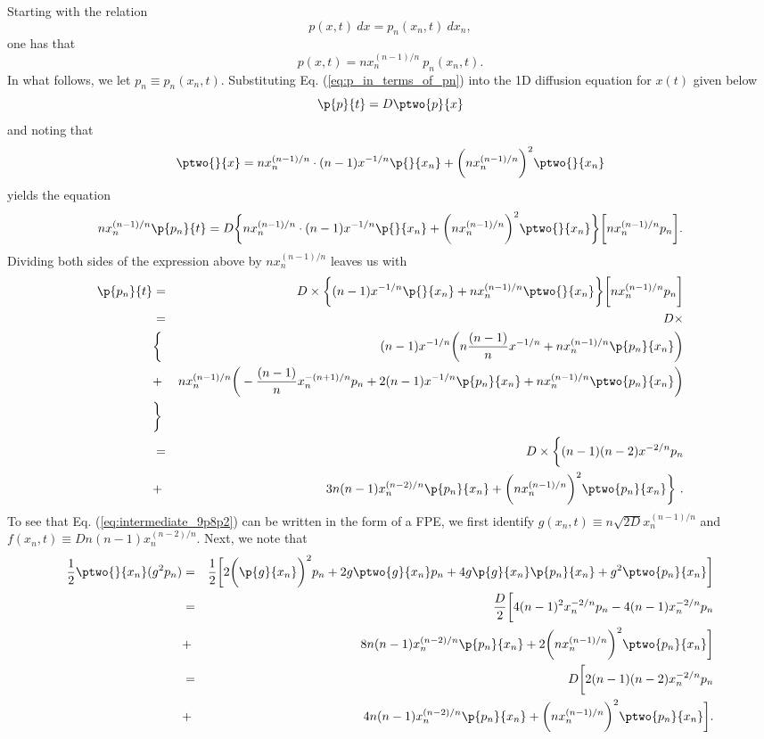 Starting with the relation
\begin{equation}
p(x, t) ~ dx = p_n(x_n, t) ~ dx_n ,  \nonumber
\end{equation}
one has that 
\begin{equation}
p(x, t) = n x_n^{(n-1)/n} ~ p_n(x_n, t). \label{eq:p_in_terms_of_pn}
\end{equation}
In what follows, we let $p_n \equiv p_n(x_n, t)$. Substituting Eq. (\ref{eq:p_in_terms_of_pn}) into the 1D diffusion equation for $x(t)$ given below
\begin{equation}
\p{p}{t} = D \ptwo{p}{x}
\end{equation}
and noting that
\begin{equation}
\ptwo{}{x} = n x_n^{(n-1)/n} \cdot (n-1) x^{-1/n} \p{}{x_n} + \bigg(n x_n^{(n-1)/n}\bigg)^2 \ptwo{}{x_n}
\end{equation}
yields the equation
\begin{equation}
n x_n^{(n-1)/n} \p{p_n}{t} = D \bigg\{ n x_n^{(n-1)/n}\cdot (n-1) x^{-1/n} \p{}{x_n} + \bigg(n x_n^{(n-1)/n}\bigg)^2 \ptwo{}{x_n}\bigg\} \bigg[n x_n^{(n-1)/n} p_n\bigg]. \nonumber 
\end{equation}
Dividing both sides of the expression above by $n x_n^{(n-1)/n}$ leaves us with
\begin{eqnarray}
 \p{p_n}{t} &=& D \times \bigg\{(n-1) x^{-1/n} \p{}{x_n} + n x_n^{(n-1)/n} \ptwo{}{x_n}\bigg\} \bigg[n x_n^{(n-1)/n} p_n\bigg] \nonumber \\
 &=& D \times \nonumber \\
 &\bigg\{& (n-1) x^{-1/n} \bigg( n \frac{(n-1)}{n} x^{-1/n} + n x_n^{(n-1)/n} \p{p_n}{x_n}\bigg) \nonumber \\
 &+&  n x_n^{(n-1)/n} \bigg( -\frac{(n-1)}{n} x_n^{-(n+1)/n} p_n + 2(n-1)x^{-1/n}\p{p_n}{x_n} +  n x_n^{(n-1)/n} \ptwo{p_n}{x_n} \bigg)\nonumber \\
 &\bigg\}& \nonumber \\
 &=& D \times \bigg\{(n-1)(n-2) x^{-2/n} p_n \nonumber \\
 &+& 3n(n-1) x_n^{(n-2)/n} \p{p_n}{x_n} + \bigg(n x_n^{(n-1)/n}\bigg)^2 \ptwo{p_n}{x_n} \bigg\}~. \label{eq:intermediate_9p8p2}
\end{eqnarray}
To see that Eq. (\ref{eq:intermediate_9p8p2}) can be written in the form of a FPE, we first identify $g(x_n, t)\equiv n \sqrt{2D} x_n^{(n-1)/n}$ and $f(x_n, t) \equiv Dn(n-1) x_n^{(n-2)/n}$. Next, we note that
\begin{eqnarray}
\frac{1}{2} \ptwo{}{x_n}(g^2 p_n) &=& \frac{1}{2} \bigg[ 2 \bigg(\p{g}{x_n} \bigg)^2 p_n + 2 g \ptwo{g}{x_n} p_n + 4 g \p{g}{x_n} \p{p_n}{x_n} + g^2 \ptwo{p_n}{x_n} \bigg] \nonumber \\ 
&=& \frac{D}{2} \bigg[ 4(n-1)^2 x_n^{-2/n} p_n - 4 (n-1) x_n^{-2/n} p_n  \nonumber \\
&+& 8 n(n-1) x_n^{(n-2)/n} \p{p_n}{x_n} + 2 \bigg(n x_n^{(n-1)/n} \bigg)^2 \ptwo{p_n}{x_n} \bigg] \nonumber \\
&=& D \bigg[ 2(n-1)(n-2)x_n^{-2/n} p_n \nonumber \\
&+& 4 n(n-1) x_n^{(n-2)/n} \p{p_n}{x_n} + \bigg(n x_n^{(n-1)/n} \bigg)^2 \ptwo{p_n}{x_n} \bigg] \label{eq:partial_g_9p8p2}.
\end{eqnarray}
